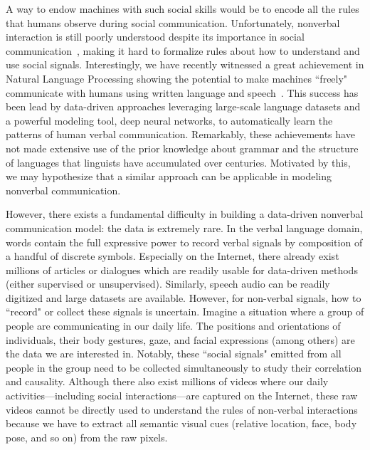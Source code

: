 A way to endow machines with such social skills would be to encode all the rules that humans observe during social communication. Unfortunately, nonverbal interaction is still poorly understood despite its importance in social communication~\cite{Mehrabian67,Mehrabian81,Birdwhistell-1970}, making it hard to formalize rules about how to understand and use social signals. Interestingly, we have recently witnessed a great achievement in Natural Language Processing showing the potential to make machines ``freely" communicate with humans using written language and speech~\cite{young2018recent}. This success has been lead by data-driven approaches leveraging large-scale language datasets and a powerful modeling tool, deep neural networks, to automatically learn the patterns of human verbal communication. Remarkably, these achievements have not made extensive use of the prior knowledge about grammar and the structure of languages that linguists have accumulated over centuries. Motivated by this, we may hypothesize that a similar approach can be applicable in modeling nonverbal communication. 


However, there exists a fundamental difficulty in building a data-driven nonverbal communication model: the data is extremely rare. In the verbal language domain, words contain the full expressive power to record verbal signals by composition of a handful of discrete symbols. Especially on the Internet, there already exist millions of articles or dialogues which are readily usable for data-driven methods (either supervised or unsupervised). Similarly, speech audio can be readily digitized and large datasets are available. However, for non-verbal signals, how to ``record" or collect these signals is uncertain. Imagine a situation where a group of people are communicating in our daily life. The positions and orientations of individuals, their body gestures, gaze, and facial expressions (among others) are the data we are interested in. Notably, these ``social signals" emitted from all people in the group need to be collected simultaneously to study their correlation and causality. Although there also exist millions of videos where our daily activities---including social interactions---are captured on the Internet, these raw videos cannot be directly used to understand the rules of non-verbal interactions because we have to extract all semantic visual cues (relative location, face, body pose, and so on) from the raw pixels. %


